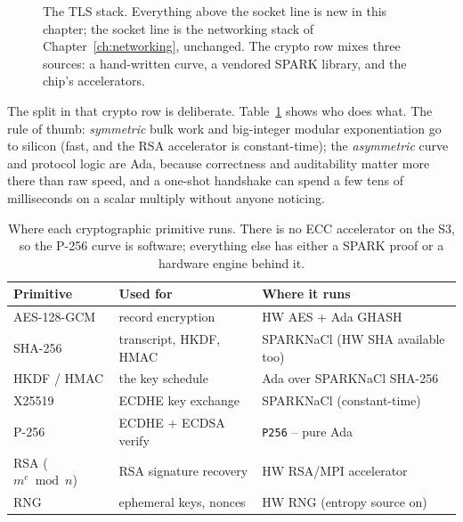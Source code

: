 \begin{figure}[ht]
\centering
{}
\caption{The TLS stack. Everything above the socket line is new in this chapter;
the socket line is the networking stack of Chapter~\ref{ch:networking}, unchanged.
The crypto row mixes three sources: a hand-written curve, a vendored SPARK library,
and the chip's accelerators.}
\label{fig:tls-layers}
\end{figure}

The split in that crypto row is deliberate. Table~\ref{tab:tls-crypto} shows who
does what. The rule of thumb: \emph{symmetric} bulk work and big-integer modular
exponentiation go to silicon (fast, and the RSA accelerator is constant-time);
the \emph{asymmetric} curve and protocol logic are Ada, because correctness and
auditability matter more there than raw speed, and a one-shot handshake can spend
a few tens of milliseconds on a scalar multiply without anyone noticing.

\begin{table}[ht]
\centering
\small
\begin{tabular}{l l l}
\toprule
\textbf{Primitive} & \textbf{Used for} & \textbf{Where it runs} \\
\midrule
AES-128-GCM        & record encryption        & HW AES + Ada GHASH \\
SHA-256            & transcript, HKDF, HMAC   & SPARKNaCl (HW SHA available too) \\
HKDF / HMAC        & the key schedule         & Ada over SPARKNaCl SHA-256 \\
X25519             & ECDHE key exchange       & SPARKNaCl (constant-time) \\
P-256              & ECDHE + ECDSA verify     & \texttt{P256} -- pure Ada \\
RSA ($m^e \bmod n$) & RSA signature recovery  & HW RSA/MPI accelerator \\
RNG                & ephemeral keys, nonces   & HW RNG (entropy source on) \\
\bottomrule
\end{tabular}
\caption{Where each cryptographic primitive runs. There is no ECC accelerator on
the S3, so the P-256 curve is software; everything else has either a SPARK proof
or a hardware engine behind it.}
\label{tab:tls-crypto}
\end{table}


